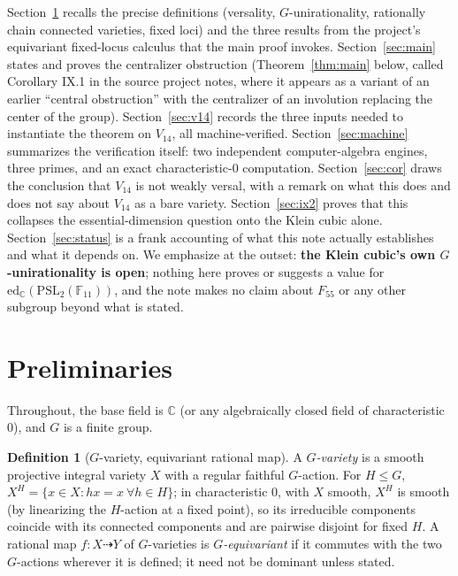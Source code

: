 \documentclass[11pt]{article}
\theoremstyle{plain}
\theoremstyle{definition}
\newtheorem{definition}[theorem]{Definition}
\theoremstyle{remark}
\newcommand{\PSL}{\mathrm{PSL}_2(\mathbb{F}_{11})}
\newcommand{\edC}{\mathrm{ed}_{\mathbb C}}
\newcommand{\dashto}{\dashrightarrow}
\begin{document}
Section~\ref{sec:prelim} recalls the precise definitions (versality,
$G$-unirationality, rationally chain connected varieties, fixed loci)
and the three results from the project's equivariant fixed-locus
calculus that the main proof invokes. Section~\ref{sec:main} states and
proves the centralizer obstruction (Theorem~\ref{thm:main} below, called
Corollary IX.1 in the source project notes, where it appears as a
variant of an earlier ``central obstruction'' with the centralizer of an
involution replacing the center of the group). Section~\ref{sec:v14}
records the three inputs needed to instantiate the theorem on $V_{14}$,
all machine-verified. Section~\ref{sec:machine} summarizes the
verification itself: two independent computer-algebra engines, three
primes, and an exact characteristic-$0$ computation. Section~\ref{sec:cor}
draws the conclusion that $V_{14}$ is not weakly versal, with a remark
on what this does and does not say about $V_{14}$ as a bare variety.
Section~\ref{sec:ix2} proves that this collapses the essential-dimension
question onto the Klein cubic alone. Section~\ref{sec:status} is a
frank accounting of what this note actually establishes and what it
depends on. We emphasize at the outset: \textbf{the Klein cubic's own
$G$-unirationality is open}; nothing here proves or suggests a value for
$\edC(\PSL)$, and the note makes no claim about $F_{55}$ or any other
subgroup beyond what is stated.

\section{Preliminaries}
\label{sec:prelim}

Throughout, the base field is $\mathbb C$ (or any algebraically closed
field of characteristic $0$), and $G$ is a finite group.

\begin{definition}[$G$-variety, equivariant rational map]
A \emph{$G$-variety} is a smooth projective integral variety $X$ with a
regular faithful $G$-action. For $H\le G$, $X^H=\{x\in X: hx=x\ \forall
h\in H\}$; in characteristic $0$, with $X$ smooth, $X^H$ is smooth (by
linearizing the $H$-action at a fixed point), so its irreducible
components coincide with its connected components and are pairwise
disjoint for fixed $H$. A rational map $f:X\dashto Y$ of $G$-varieties
is \emph{$G$-equivariant} if it commutes with the two $G$-actions
wherever it is defined; it need not be dominant unless stated.
\end{definition}
\end{document}
